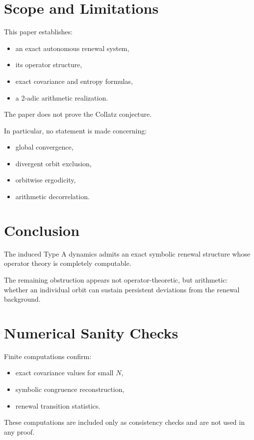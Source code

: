 \documentclass[11pt]{article}
\begin{document}
\section{Scope and Limitations}

This paper establishes:
\begin{itemize}
\item an exact autonomous renewal system,
\item its operator structure,
\item exact covariance and entropy formulas,
\item a 2-adic arithmetic realization.
\end{itemize}

The paper does not prove the Collatz conjecture.

In particular, no statement is made concerning:
\begin{itemize}
\item global convergence,
\item divergent orbit exclusion,
\item orbitwise ergodicity,
\item arithmetic decorrelation.
\end{itemize}

\section{Conclusion}

The induced Type A dynamics admits an exact symbolic renewal structure whose
operator theory is completely computable.

The remaining obstruction appears not operator-theoretic, but arithmetic:
whether an individual orbit can sustain persistent deviations from the renewal
background.

\appendix

\section{Numerical Sanity Checks}

Finite computations confirm:
\begin{itemize}
\item exact covariance values for small \(N\),
\item symbolic congruence reconstruction,
\item renewal transition statistics.
\end{itemize}

These computations are included only as consistency checks and are not used in any proof.
\end{document}
